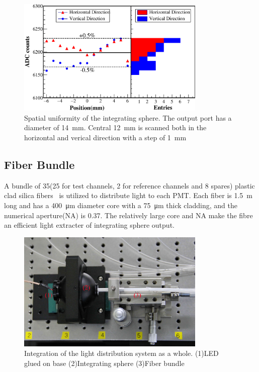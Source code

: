 \documentclass[5p, times]{elsarticle}
\begin{document}
\begin{figure}
 \centering
 \includegraphics[width=90mm]{uniformity_integratingsphere}
\caption{Spatial uniformity of the integrating sphere.
The output port has a diameter of \SI{14}{\milli\meter}.
Central \SI{12}{\milli\meter} is scanned both in the horizontal and verical direction with a step of \SI{1}{\milli\meter}}
\label{fig:uniformity_integratingsphere}
\end{figure} 

\subsection{Fiber Bundle}
\label{sec:fiber_bundle}

A bundle of 35(25 for test channels, 2 for reference channels and 8 spares) plastic clad silica fibers~\cite{optical_fibre} is utilized to distribute light to each PMT.
Each fiber is \SI{1.5}{\meter} long and has a \SI{400}{\micro\meter} diameter core with a \SI{75}{\micro\meter} thick cladding, and the numerical aperture(NA) is 0.37.
The relatively large core and NA make the fibre an efficient light extracter of integrating sphere output. 

\begin{figure}
 \centering
 \includegraphics[width=90mm]{light_dist_label}
\caption{Integration of the light distribution system as a whole.
(1)LED glued on base (2)Integrating sphere (3)Fiber bundle}
\label{fig:light_source}
\end{figure} 
\end{document}
